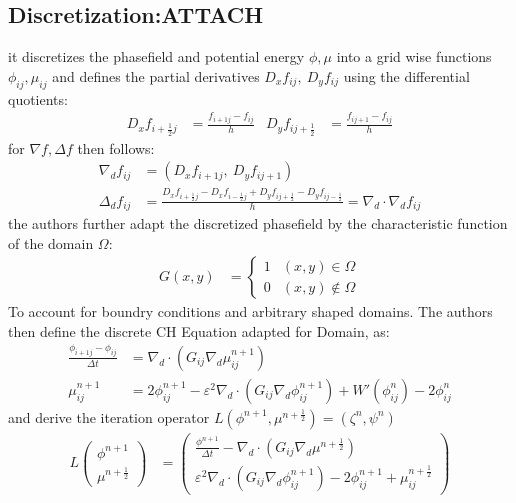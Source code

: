 \documentclass[11pt]{article}
\begin{document}
\subsection{Discretization:\hfill{}\textsc{ATTACH}}
\label{sec:orgf15dcc5}
it discretizes the phasefield and potential energy \(\phi, \mu\) into a grid wise functions \(\phi_{ij}, \mu_{ij}\) and defines the partial derivatives \(D_xf_{ij}, \  D_yf_{ij}\) using the differential quotients:
\begin{align*}
D_xf_{i+\frac{1}{2} j} &= \frac{f_{i+1j} - f_{ij}}{h} & D_yf_{ij+\frac{1}{2}} &= \frac{f_{ij+1} - f_{ij}}{h}
\end{align*}
for \(\nabla f , \Delta f\) then follows:
\begin{align*}
\nabla_d f_{ij} &= (D_x f_{i+1j} , \ D_y f_{ij+1}) \\
 \Delta_d f_{ij} &= \frac{D_x f_{i+\frac{1}{2}j} -  D_x f_{i-\frac{1}{2}j} + D_y f_{ij+\frac{1}{2}} - D_y f_{ij-\frac{1}{2}}}{h} = \nabla_d \cdot  \nabla_d f_{ij}
\end{align*}
the authors further adapt the discretized phasefield by the characteristic function of the domain \(\Omega\):
\begin{align*}
G(x,y) &=
\begin{cases}
1 & (x,y) \in  \Omega \\
0 & (x,y) \not\in  \Omega
\end{cases}
\end{align*}
To account for boundry conditions and arbitrary shaped domains.
The authors \autocite{SHIN20117441} then define the discrete CH Equation adapted for Domain, as:
\begin{align*}
\frac{\phi_{i+1j} - \phi_{ij}}{\Delta t}  &=  \nabla _d \cdot (G_{ij} \nabla_d \mu_{ij}^{n+1} )  \\
 \mu_{ij}^{n+1} &= 2\phi_{ij}^{n+1} - \varepsilon^2  \nabla_d \cdot  (G_{ij} \nabla _d \phi_{ij}^{n+1} ) + W'(\phi_{ij}^n) - 2\phi _{ij}^n
\end{align*}
and derive the iteration operator \(L(\phi^{n+1} , \mu^{n+\frac{1}{2}}) = (\zeta^n ,\psi^n)\)
\begin{align*}
L
\begin{pmatrix}
\phi^{n+1} \\
\mu^{n+\frac{1}{2}}
\end{pmatrix}
&=
\begin{pmatrix}
\frac{\phi^{n+1}}{\Delta t} - \nabla _d \cdot  ( G_{ij} \nabla _d \mu^{n+\frac{1}{2}} ) \\
\varepsilon^2 \nabla _d \cdot  (G_{ij} \nabla_d \phi_{ij}^{n+1}) - 2\phi_{ij}^{n+1} + \mu_{ij}^{n+\frac{1}{2}}
\end{pmatrix}
\end{align*}
\end{document}
